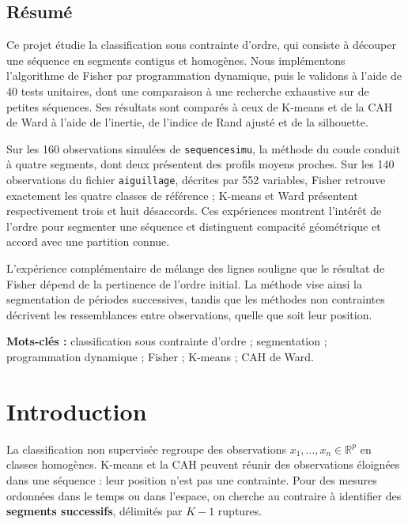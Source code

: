 \documentclass[10pt,a4paper]{article}
\begin{document}
\begin{center}
\begin{minipage}{0.90\textwidth}
\section*{Résumé}
\fontsize{11.5}{17}\selectfont
\vspace{0.5cm}
Ce projet étudie la classification sous contrainte d'ordre, qui consiste à
découper une séquence en segments contigus et homogènes. Nous implémentons
l'algorithme de Fisher par programmation dynamique, puis le validons à l'aide
de 40 tests unitaires, dont une comparaison à une recherche exhaustive sur de
petites séquences. Ses résultats sont comparés à ceux de K-means et de la CAH de
Ward à l'aide de l'inertie, de l'indice de Rand ajusté et de la silhouette.
\par\smallskip
Sur les 160 observations simulées de \texttt{sequencesimu}, la méthode du coude
conduit à quatre segments, dont deux présentent des profils moyens proches.
Sur les 140 observations du fichier \texttt{aiguillage}, décrites par 552 variables,
Fisher retrouve exactement les quatre classes de référence ; K-means et Ward
présentent respectivement trois et huit désaccords. Ces expériences montrent
l'intérêt de l'ordre pour segmenter une séquence et distinguent compacité
géométrique et accord avec une partition connue.
\par\medskip
L'expérience complémentaire de mélange des lignes souligne que le résultat de
Fisher dépend de la pertinence de l'ordre initial. La méthode vise ainsi la
segmentation de périodes successives, tandis que les méthodes non contraintes
décrivent les ressemblances entre observations, quelle que soit leur position.
\par\bigskip
\begin{boitebilan}
\textbf{Mots-clés :} classification sous contrainte d'ordre ; segmentation ;
programmation dynamique ; Fisher ; K-means ; CAH de Ward.
\end{boitebilan}
\end{minipage}
\end{center}
\clearpage
{}
\fontsize{10.5}{12.7}\selectfont
\section{Introduction}
La classification non supervisée regroupe des observations $x_1,\ldots,x_n\in
\mathbb{R}^p$ en classes homogènes. K-means et la CAH peuvent réunir des
observations éloignées dans une séquence : leur position n'est pas une contrainte.
Pour des mesures ordonnées dans le temps ou dans l'espace, on cherche au contraire
à identifier des \textbf{segments successifs}, délimités par $K-1$ ruptures.
\end{document}
